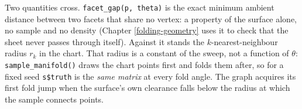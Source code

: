 \documentclass[
  british,
  a4paper,
]{book}
\newenvironment{Shaded}{\begin{snugshade}}{\end{snugshade}}
\newcommand{\AttributeTok}[1]{\textcolor[rgb]{0.13,0.29,0.53}{#1}}
\newcommand{\CommentTok}[1]{\textcolor[rgb]{0.56,0.35,0.01}{\textit{#1}}}
\newcommand{\ConstantTok}[1]{\textcolor[rgb]{0.56,0.35,0.01}{#1}}
\newcommand{\ControlFlowTok}[1]{\textcolor[rgb]{0.13,0.29,0.53}{\textbf{#1}}}
\newcommand{\DataTypeTok}[1]{\textcolor[rgb]{0.13,0.29,0.53}{#1}}
\newcommand{\DecValTok}[1]{\textcolor[rgb]{0.00,0.00,0.81}{#1}}
\newcommand{\FloatTok}[1]{\textcolor[rgb]{0.00,0.00,0.81}{#1}}
\newcommand{\FunctionTok}[1]{\textcolor[rgb]{0.13,0.29,0.53}{\textbf{#1}}}
\newcommand{\NormalTok}[1]{#1}
\newcommand{\OtherTok}[1]{\textcolor[rgb]{0.56,0.35,0.01}{#1}}
\newcommand{\SpecialCharTok}[1]{\textcolor[rgb]{0.81,0.36,0.00}{\textbf{#1}}}
\begin{document}
Two quantities cross. \texttt{facet\_gap(p,\ theta)} is the exact minimum ambient distance
between two facets that share no vertex: a property of the surface alone, no
sample and no density (Chapter \ref{folding-geometry} uses it to check that the
sheet never passes through itself). Against it stands the \(k\)-nearest-neighbour
radius \(r_k\) in the chart. That radius is a constant of the sweep, not a function
of \(\theta\): \texttt{sample\_manifold()} draws the chart points first and folds them
after, so for a fixed seed \texttt{s\$truth} is the \emph{same matrix} at every fold angle.
The graph acquires its first fold jump when the surface's own clearance falls
below the radius at which the sample connects points.

\begin{Shaded}
\end{Shaded}
\end{document}
